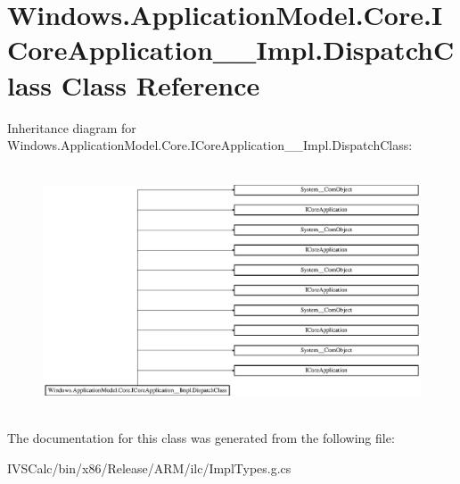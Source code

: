 \hypertarget{class_windows_1_1_application_model_1_1_core_1_1_i_core_application_____impl_1_1_dispatch_class}{}\section{Windows.\+Application\+Model.\+Core.\+I\+Core\+Application\+\_\+\+\_\+\+Impl.\+Dispatch\+Class Class Reference}
\label{class_windows_1_1_application_model_1_1_core_1_1_i_core_application_____impl_1_1_dispatch_class}
Inheritance diagram for Windows.\+Application\+Model.\+Core.\+I\+Core\+Application\+\_\+\+\_\+\+Impl.\+Dispatch\+Class\+:\begin{figure}[H]
\begin{center}
\leavevmode
\includegraphics[height=7.298578cm]{class_windows_1_1_application_model_1_1_core_1_1_i_core_application_____impl_1_1_dispatch_class}
\end{center}
\end{figure}


The documentation for this class was generated from the following file\+:\begin{DoxyCompactItemize}
\item 
I\+V\+S\+Calc/bin/x86/\+Release/\+A\+R\+M/ilc/Impl\+Types.\+g.\+cs\end{DoxyCompactItemize}
